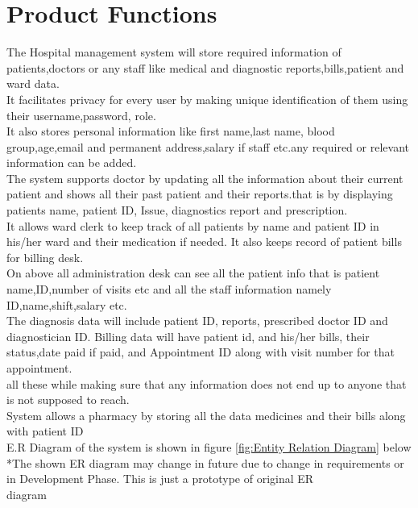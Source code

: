 \documentclass{scrreprt}
\begin{document}
\section{Product Functions}
The Hospital management system will store required information of patients,doctors or any staff like medical and diagnostic reports,bills,patient and ward data.\\
\newline
It facilitates privacy for every user by making unique identification of them using their username,password, role.\\
\newline
It also stores personal information like first name,last name, blood group,age,email and permanent address,salary if staff etc.any 
required or relevant information can be added.\\
\newline
The system supports doctor by updating all the information about their current patient and shows all their past patient and their reports.that is by displaying patients name, patient ID, Issue, diagnostics report and prescription.\\
\newline
It allows ward clerk to keep track of all patients by name and patient ID in his/her ward and their medication if needed. It also keeps record of patient bills for billing desk.\\
\newline
On above all administration desk can see all the patient info that is patient name,ID,number of visits etc and all the staff information namely ID,name,shift,salary etc.\\
\newline 
The diagnosis data will include patient ID, reports, prescribed doctor ID and diagnostician ID. Billing data will have patient id, and his/her bills, their status,date paid if paid, and Appointment ID along with visit number for that appointment.\\
\newline
all these while making sure that any information does not end up to anyone that is not supposed to reach.\\
\newline
System allows a pharmacy by storing all the data medicines and their bills along with patient ID\\
\newline
E.R Diagram of the system is shown in figure \ref{fig:Entity Relation Diagram} below\\
\newline
*The shown ER diagram may change in future due to change in requirements or in Development Phase. This is just a prototype of original ER\\ diagram
\newline
\end{document}
